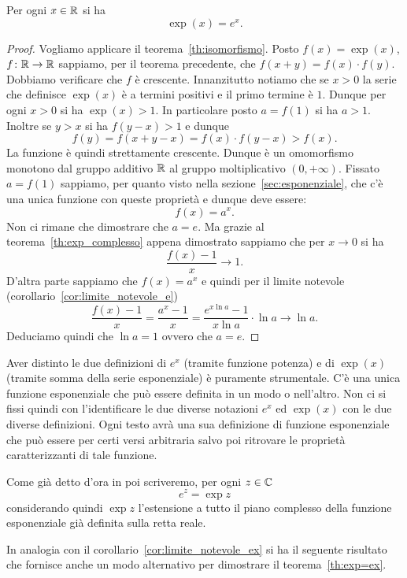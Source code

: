 \begin{theorem}%
\label{th:exp=ex}%
%
\mymark{***}%
Per ogni $x\in {\mathbb R}$ si ha
\[
  \exp(x) = e^x.
\]
\end{theorem}
%
\begin{proof}\mymark{**}
Vogliamo applicare il teorema~\ref{th:isomorfismo}.
Posto $f(x)=\exp(x)$, $f\colon {\mathbb R}\to{\mathbb R}$ sappiamo,
per il teorema precedente, che $f(x+y)=f(x)\cdot f(y)$.
Dobbiamo verificare che $f$ è crescente.
Innanzitutto notiamo che se $x> 0$ la serie che definisce
$\exp(x)$ è a termini positivi e il primo termine è $1$.
Dunque per ogni $x> 0$ si ha $\exp(x)>1$.
In particolare posto $a=f(1)$ si ha $a>1$.
Inoltre se $y>x$ si ha $f(y-x)>1$ e dunque
\[
 f(y) = f(x+y-x) = f(x)\cdot f(y-x) > f(x).
\]
La funzione è quindi strettamente crescente. 
Dunque è un omomorfismo monotono dal gruppo additivo ${\mathbb R}$ al 
gruppo moltiplicativo $(0,+\infty)$.
Fissato $a=f(1)$ sappiamo,
per quanto visto nella sezione~\ref{sec:esponenziale},
che c'è una unica funzione con queste proprietà e dunque 
deve essere: 
\[
  f(x)= a^x.
\]
Non ci rimane che dimostrare che $a=e$.
Ma grazie al teorema~\ref{th:exp_complesso}
appena dimostrato sappiamo che per $x\to 0$ si ha
\[
  \frac{f(x)-1}{x}\to 1.
\]
D'altra parte sappiamo che $f(x)=a^x$ e quindi
per il limite notevole (corollario~\ref{cor:limite_notevole_e})
\[
\frac{f(x)-1}{x} = \frac{a^{x}-1}{x}
= \frac{e^{x \ln a}-1}{x \ln a} \cdot \ln a
\to \ln a.
\]
Deduciamo quindi che $\ln a= 1$ ovvero che $a=e$.
\end{proof}

Aver distinto le due definizioni di $e^x$ (tramite funzione potenza) e di $\exp(x)$ (tramite somma della serie esponenziale) è puramente strumentale.
C'è una unica funzione esponenziale che può essere definita in
un modo o nell'altro. Non ci si fissi quindi con l'identificare
le due diverse notazioni $e^x$ ed $\exp(x)$ con le due diverse definizioni.
Ogni testo avrà una sua definizione di funzione esponenziale che può
essere per certi versi arbitraria salvo poi ritrovare le proprietà
caratterizzanti di tale funzione.

Come già detto d'ora in poi scriveremo, per ogni $z\in {\mathbb C}$
\[
  e^z = \exp z
\]
considerando quindi $\exp z$ l'estensione a tutto il piano complesso
della funzione esponenziale già definita
sulla retta reale.

In analogia con il corollario~\ref{cor:limite_notevole_ex}
si ha il seguente risultato che fornisce anche un 
modo alternativo per dimostrare il teorema~\ref{th:exp=ex}.

